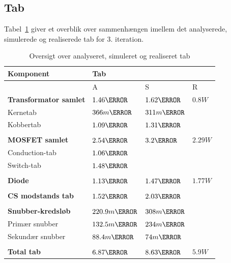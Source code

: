 \subsection{Tab}
Tabel~\ref{tab:realisering_tab_3} giver et overblik over sammenhængen imellem det analyserede, simulerede og realiserede tab for 3. iteration.
\begin{table}[H] 			
	\centering
	\begin{tabularx}{\textwidth}{|X|l|l|l|}
		\hline
		\textbf{\large Komponent} & \multicolumn{3}{|l|}{\textbf{\large Tab}} \\ \hline
		& A & S & R	\\ \hline
		\textbf{Transformator samlet} & $1.46\watt$ & $1.62\watt$ & $0.8W$ \\ \hline 
		Kernetab & $366m\watt$ & $311m\watt$ & \\ \hline
		Kobbertab & $1.09\watt$ & $1.31\watt$ & \\ \hline
		& &	& \\ \hline
		\textbf{MOSFET samlet} & $2.54\watt$ & $3.2\watt$ & $2.29W$ \\ \hline
		Conduction-tab & $1.06\watt$ &  &	\\ \hline
		Switch-tab & $1.48\watt$ & 	&		\\ \hline
		& &	& \\ \hline
		\textbf{Diode} & $1.13\watt$ & $1.47\watt$ & $1.77W$ \\ \hline
		& &	& \\ \hline
		\textbf{CS modstands tab} & $1.52\watt$ & $2.03\watt$ & \\ \hline
		& & &	\\ \hline
		\textbf{Snubber-kredsløb} & $220.9m\watt$ & $308m\watt$ & \\ \hline
		Primær snubber	& $132.5m\watt$	& $234m\watt$	&	\\ \hline
		Sekundær snubber &	$88.4m\watt$ &	$74m\watt$	&	\\ \hline
		& &	& \\ \hline
		\textbf{Total tab} & $6.87\watt$ & $8.63\watt$ & $5.9W$	\\ \hline
	\end{tabularx}
	\caption{Oversigt over analyseret, simuleret og realiseret tab}
	\label{tab:realisering_tab_3}
\end{table}